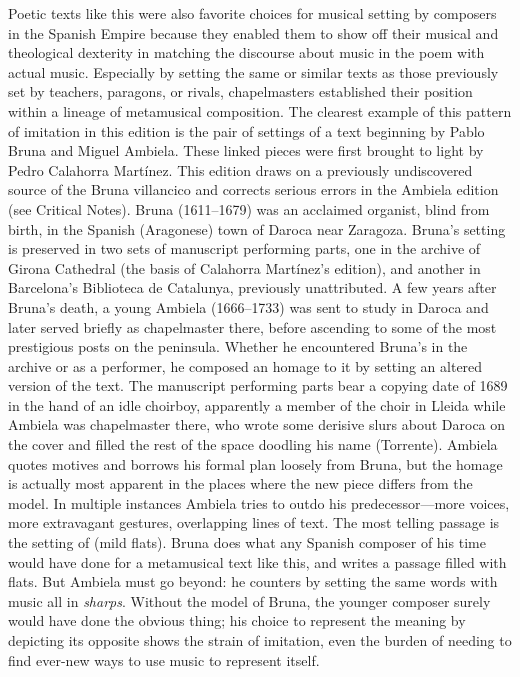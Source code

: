 Poetic texts like this were also favorite choices for musical setting by
composers in the Spanish Empire because they enabled them to show off their
musical and theological dexterity in matching the discourse about music in the
poem with actual music.
Especially by setting the same or similar texts as those previously set
by teachers, paragons, or rivals, chapelmasters established their position
within a lineage of metamusical composition.
The clearest example of this pattern of imitation in this edition is the pair
of settings of a text beginning  by Pablo
Bruna and Miguel Ambiela.
These linked pieces were first brought to light by Pedro Calahorra Martínez.%
    \Autocite{Calahorra:Suban}
This edition draws on a previously undiscovered source of the Bruna villancico
and corrects serious errors in the Ambiela edition (see Critical Notes).
Bruna (1611--1679) was an acclaimed organist, blind from birth, in the
Spanish (Aragonese) town of Daroca near Zaragoza.
Bruna's setting is preserved in two sets of manuscript performing parts, one
in the archive of Girona Cathedral (the basis of Calahorra Martínez's
edition), and another in Barcelona's Biblioteca de Catalunya, previously
unattributed.
A few years after Bruna's death, a young Ambiela (1666--1733) was sent to
study in Daroca and later served briefly as chapelmaster there, before
ascending to some of the most prestigious posts on the peninsula.
Whether he encountered Bruna's  in the archive or as a
performer, he composed an homage to it by setting an altered version of the
text.
The manuscript performing parts bear a copying date of 1689 in the hand of an
idle choirboy, apparently a member of the choir in Lleida while Ambiela was
chapelmaster there, who wrote some derisive slurs about Daroca on the cover
and filled the rest of the space doodling his name (Torrente).
Ambiela quotes motives and borrows his formal plan loosely from Bruna, but the
homage is actually most apparent in the places where the new piece differs
from the model.
In multiple instances Ambiela tries to outdo his predecessor---more voices,
more extravagant gestures, overlapping lines of text.
The most telling passage is the setting of  (mild
flats).
Bruna does what any Spanish composer of his time would have done for a
metamusical text like this, and writes a passage filled with flats.
But Ambiela must go beyond: he counters by setting the same words with music
all in \emph{sharps}. 
Without the model of Bruna, the younger composer surely would have done the
obvious thing; his choice to represent the meaning by depicting its opposite
shows the strain of imitation, even the burden of needing to find ever-new
ways to use music to represent itself.

